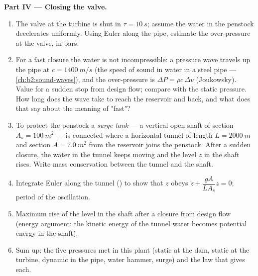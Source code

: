 \begin{problem}
\medskip
\noindent\textbf{Part IV --- Closing the valve.}
\begin{enumerate}[resume]
  \item The valve at the turbine is shut in $\tau = \qty{10}{s}$; assume the
        water in the penstock decelerates uniformly. Using Euler along
        the pipe, estimate the over-pressure at the valve, in bars.
  \item For a fast closure the water is not incompressible: a pressure
        wave travels up the pipe at $c = \qty{1400}{m/s}$ (the speed of
        sound in water in a steel pipe --- \cref{ch:b2:sound-waves}),
        and the over-pressure is $\Delta P = \rho c\,\Delta v$ (Joukowsky).
        Value for a sudden stop from design flow; compare with the
        static pressure. How long does the wave take to reach the
        reservoir and back, and what does that say about the meaning
        of "fast"?
  \item To protect the penstock a \emph{surge tank} --- a vertical open
        shaft of section $A_s = \qty{100}{m^2}$ --- is connected where a
        horizontal tunnel of length $L = \qty{2000}{m}$ and section $A =
        \qty{7.0}{m^2}$ from the reservoir joins the penstock. After a
        sudden closure, the water in the tunnel keeps moving and the
        level $z$ in the shaft rises. Write mass conservation between
        the tunnel and the shaft.
  \item Integrate Euler along the tunnel () to show that
        $z$ obeys $\ddot z + \dfrac{gA}{LA_s}z = 0$; period of the
        oscillation.
  \item Maximum rise of the level in the shaft after a closure from
        design flow (energy argument: the kinetic energy of the tunnel
        water becomes potential energy in the shaft).
  \item Sum up: the five pressures met in this plant (static at the
        dam, static at the turbine, dynamic in the pipe, water hammer,
        surge) and the law that gives each.
\end{enumerate}
\end{problem}
